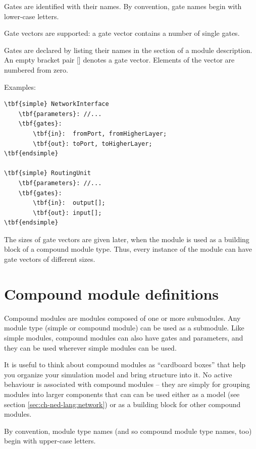Gates are identified with their names.
By convention, gate names begin with lower-case letters.

Gate vectors are supported: a gate vector
contains a number of single gates.

Gates are declared by listing their names in the
 section of a module description. An
empty bracket pair [] denotes a gate vector.
Elements of the vector are numbered from zero.

Examples:

\begin{Verbatim}[commandchars=\\\{\}]
\tbf{simple} NetworkInterface
    \tbf{parameters}: //...
    \tbf{gates}:
        \tbf{in}:  fromPort, fromHigherLayer;
        \tbf{out}: toPort, toHigherLayer;
\tbf{endsimple}

\tbf{simple} RoutingUnit
    \tbf{parameters}: //...
    \tbf{gates}:
        \tbf{in}:  output[];
        \tbf{out}: input[];
\tbf{endsimple}
\end{Verbatim}

The sizes of gate vectors are given later, when the module is used as
a building block of a compound module type. Thus, every instance of
the module can have gate vectors of different sizes.





\section{Compound module definitions}


Compound modules are modules composed of one or more submodules.
Any module type (simple or compound module) can be used as a submodule.
Like simple modules, compound modules can also have gates and parameters,
and they can be used wherever simple modules can be used.

It is useful to think about compound modules as ``cardboard boxes''
that help you organize your simulation model and bring structure into
it. No active behaviour is associated with compound modules -- they
are simply for grouping modules into larger components that can
can be used either as a model (see section \ref{sec:ch-ned-lang:network})
or as a building block for other compound modules.

By convention, module type names (and so compound module type names, too)
begin with upper-case letters.

